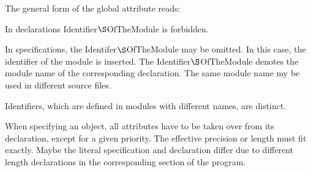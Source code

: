 The general form of the global attribute reads:



In declarations Identifier$\S $OfTheModule is forbidden.

In specifications, the Identifer$\S $OfTheModule  may be omitted. 
In this case, the identifier of the module is inserted.
The Identifier$\S $OfTheModule denotes the module name of the corresponding
declaration.
The same module name my be used in different source files.

Identifiers, which are defined in modules with different names, are distinct.



When specifying an object, all attributes have to be taken over from its
declaration, except for a given priority. 
The effective precision or length 
must fit exactly. Maybe the literal specification and declaration differ 
due to different length declarations
 in the corresponding section of the program.

